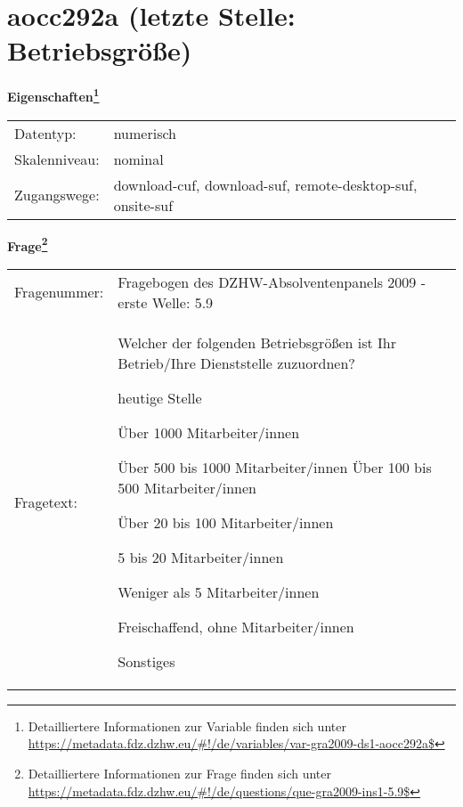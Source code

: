 
    \setcounter{footnote}{0}

    \vspace*{-1.8cm}
	\section{aocc292a (letzte Stelle: Betriebsgröße)}
	\label{section:aocc292a}



    \vspace*{0.5cm}
    \noindent\textbf{Eigenschaften\footnote{Detailliertere Informationen zur Variable finden sich unter
		\url{https://metadata.fdz.dzhw.eu/\#!/de/variables/var-gra2009-ds1-aocc292a$}}}\\
	\begin{tabularx}{\hsize}{@{}lX}
	Datentyp: & numerisch \\
	Skalenniveau: & nominal \\
	Zugangswege: &
	  download-cuf, 
	  download-suf, 
	  remote-desktop-suf, 
	  onsite-suf
 \\
    \end{tabularx}



				\vspace*{0.5cm}
                \noindent\textbf{Frage\footnote{Detailliertere Informationen zur Frage finden sich unter
		              \url{https://metadata.fdz.dzhw.eu/\#!/de/questions/que-gra2009-ins1-5.9$}}}\\
				\begin{tabularx}{\hsize}{@{}lX}
					Fragenummer: &
					  Fragebogen des DZHW-Absolventenpanels 2009 - erste Welle:
					  5.9
 \\
					Fragetext: & Welcher der folgenden Betriebsgrößen ist Ihr Betrieb/Ihre Dienststelle zuzuordnen?\par  heutige Stelle\par  Über 1000 Mitarbeiter/innen\par  Über 500 bis 1000 Mitarbeiter/innen Über 100 bis 500 Mitarbeiter/innen\par  Über 20 bis 100 Mitarbeiter/innen\par  5 bis 20 Mitarbeiter/innen\par  Weniger als 5 Mitarbeiter/innen\par  Freischaffend, ohne Mitarbeiter/innen\par  Sonstiges \\
				\end{tabularx}





